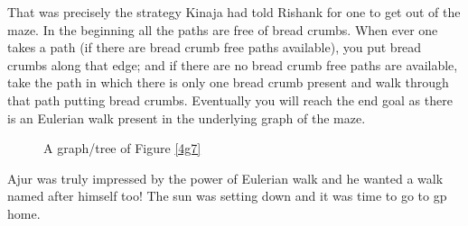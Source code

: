 That was precisely the strategy Kinaja had told Rishank for one to get out of the maze.  In the beginning all the paths are free of bread crumbs. When ever one takes a path (if there are bread crumb free paths available), you put bread crumbs along that edge; and if there are no bread crumb free paths are available, take the path in which there is only one bread crumb present and walk through that path putting bread crumbs. Eventually you will reach the end goal as there is an Eulerian walk present in the underlying graph of the maze.

\begin{figure}
\begin{center}
\caption{ A graph/tree of Figure \ref{4g7}}\label{4g8}
\end{center}
\end{figure}

Ajur was truly impressed by the power of Eulerian walk and he wanted a walk named after himself too! The sun was setting down and it was time to go to gp home.